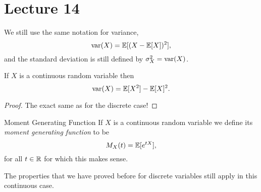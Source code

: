 \documentclass[class=article, crop=false]{standalone}
\begin{document}
  \section{Lecture 14}
  We still use the same notation for variance,
  \[
    \operatorname{var}(X) = \mathbb{E}[(X - \mathbb{E}[X])^2],
  \]
  and the standard deviation is still defined by $\sigma_X^2 = \operatorname{var}(X)$.
  \begin{theorem}{}
    If $X$ is a continuous random variable then
    \[
      \operatorname{var}(X) = \mathbb{E}[X^2] - \mathbb{E}[X]^2.
    \]
    \begin{proof}
      The exact same as for the discrete case!
    \end{proof}
  \end{theorem}
  \begin{definition}{Moment Generating Function}
    If $X$ is a continuous random variable we define its \emph{moment generating function} to be 
    \[
      M_X(t) = \mathbb{E}[e^{tX}],
    \]
    for all $t\in\mathbb{R}$ for which this makes sense.
  \end{definition}
  The properties that we have proved before for discrete variables still apply in this continuous case.
\end{document}
